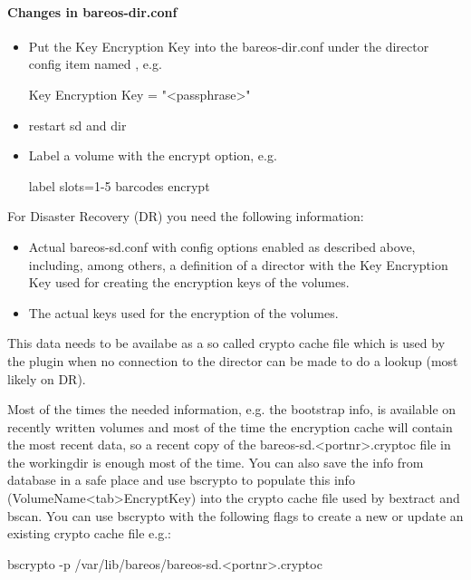 \paragraph{Changes in bareos-dir.conf}

\begin{itemize}
 \item Put the Key Encryption Key into the bareos-dir.conf under the director config item named , e.g.
 \begin{bconfig}{}
 Key Encryption Key = "<passphrase>"
 \end{bconfig}
 \item restart sd and dir
 \item Label a volume with the encrypt option, e.g.
 \begin{bconfig}{}
  label slots=1-5 barcodes encrypt
 \end{bconfig}
\end{itemize}

For Disaster Recovery (DR) you need the following information:

\begin{itemize}
 \item Actual bareos-sd.conf with config options enabled as described above, including, among others, a definition of a director with the Key Encryption Key used for creating the encryption keys of the volumes.
 \item The actual keys used for the encryption of the volumes.
\end{itemize}

This data needs to be availabe as a so called crypto cache file which is used by the plugin when no connection to the director can be made to do a lookup (most likely on DR).

Most of the times the needed information, e.g. the bootstrap info, is available on recently written volumes and most of the time the encryption cache will contain the most recent data, so a recent copy of the bareos-sd.<portnr>.cryptoc file in the workingdir is enough most of the time. You can also save the info from database in a safe place and use bscrypto to populate this info (VolumeName<tab>EncryptKey) into the crypto cache file used by bextract and bscan. You can use bscrypto with the following flags to create a new or update an existing crypto cache file e.g.:

\begin{commands}{}
 bscrypto -p /var/lib/bareos/bareos-sd.<portnr>.cryptoc
\end{commands}


